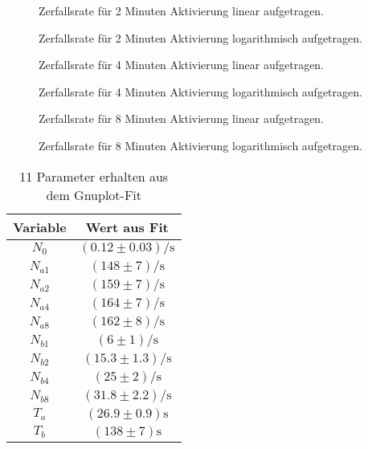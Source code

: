 \documentclass[12pt,a4paper,titlepage,headinclude,bibtotoc]{scrartcl}
\begin{document}
\begin{figure}[h]
\centering

\caption{Zerfallsrate für 2 Minuten Aktivierung linear aufgetragen.}
\label{fig:2min}
\end{figure}
\begin{figure}[h]
\centering

\caption{Zerfallsrate für 2 Minuten Aktivierung logarithmisch aufgetragen.}
\label{fig:2minlog}
\end{figure}

\begin{figure}[h]
\centering

\caption{Zerfallsrate für 4 Minuten Aktivierung linear aufgetragen.}
\label{fig:4min}
\end{figure}
\begin{figure}[h]
\centering

\caption{Zerfallsrate für 4 Minuten Aktivierung logarithmisch aufgetragen.}
\label{fig:4minlog}
\end{figure}

\begin{figure}[h]
\centering

\caption{Zerfallsrate für 8 Minuten Aktivierung linear aufgetragen.}
\label{fig:8min}
\end{figure}
\begin{figure}[h]
\centering

\caption{Zerfallsrate für 8 Minuten Aktivierung logarithmisch aufgetragen.}
\label{fig:8minlog}
\end{figure}


\begin{table}
\centering
\begin{tabular}{|c|c|}
\hline
Variable & Wert aus Fit \\\hline\hline
$N_0  $          &$(0.12\pm 0.03)\si{\per\second} $\\\hline\hline
$ N_{a1} $          &$(148\pm 7  )\si{\per\second}  $\\\hline
$ N_{a2} $          &$(159\pm 7)\si{\per\second}   $\\\hline
$ N_{a4} $          &$(164\pm 7)\si{\per\second}   $\\\hline
$N_{a8} $          &$(162\pm 8 )\si{\per\second}  $\\\hline\hline
$N_{b1} $          &$(6\pm 1     )\si{\per\second}  $\\\hline
$N_{b2} $          &$(15.3\pm 1.3 )\si{\per\second}  $\\\hline
$N_{b4} $          &$(25\pm 2 )\si{\per\second}  $\\\hline
$N_{b8} $          &$(31.8\pm 2.2 )\si{\per\second}  $\\\hline\hline
$T_a  $          &$(26.9   \pm 0.9) \si\second  $\\\hline
$T_b  $          &$(138  \pm 7)\si\second    $\\\hline
\end{tabular}
\caption{11  Parameter erhalten aus dem Gnuplot-Fit}
\label{tab:parameter}
\end{table}
\end{document}

